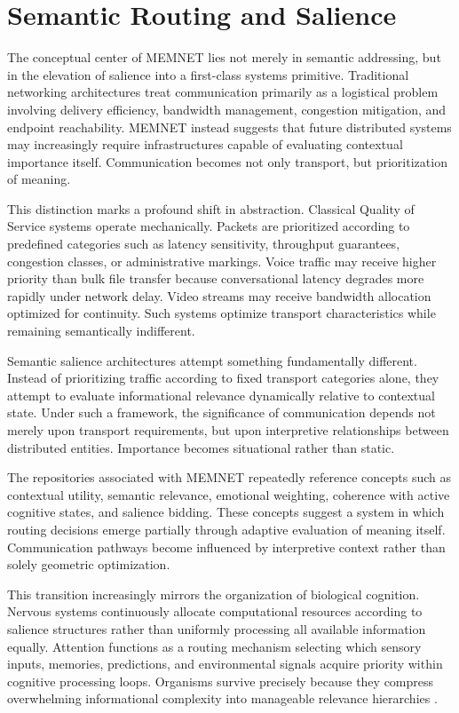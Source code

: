 \documentclass[11pt,a4paper]{article}
\begin{document}
\section{Semantic Routing and Salience}

The conceptual center of MEMNET lies not merely in semantic addressing, but in the elevation of salience into a first-class systems primitive. Traditional networking architectures treat communication primarily as a logistical problem involving delivery efficiency, bandwidth management, congestion mitigation, and endpoint reachability. MEMNET instead suggests that future distributed systems may increasingly require infrastructures capable of evaluating contextual importance itself. Communication becomes not only transport, but prioritization of meaning.

This distinction marks a profound shift in abstraction. Classical Quality of Service systems operate mechanically. Packets are prioritized according to predefined categories such as latency sensitivity, throughput guarantees, congestion classes, or administrative markings. Voice traffic may receive higher priority than bulk file transfer because conversational latency degrades more rapidly under network delay. Video streams may receive bandwidth allocation optimized for continuity. Such systems optimize transport characteristics while remaining semantically indifferent.

Semantic salience architectures attempt something fundamentally different. Instead of prioritizing traffic according to fixed transport categories alone, they attempt to evaluate informational relevance dynamically relative to contextual state. Under such a framework, the significance of communication depends not merely upon transport requirements, but upon interpretive relationships between distributed entities. Importance becomes situational rather than static.

The repositories associated with MEMNET repeatedly reference concepts such as contextual utility, semantic relevance, emotional weighting, coherence with active cognitive states, and salience bidding. These concepts suggest a system in which routing decisions emerge partially through adaptive evaluation of meaning itself. Communication pathways become influenced by interpretive context rather than solely geometric optimization.

This transition increasingly mirrors the organization of biological cognition. Nervous systems continuously allocate computational resources according to salience structures rather than uniformly processing all available information equally. Attention functions as a routing mechanism selecting which sensory inputs, memories, predictions, and environmental signals acquire priority within cognitive processing loops. Organisms survive precisely because they compress overwhelming informational complexity into manageable relevance hierarchies \cite{friston2010}.
\end{document}
